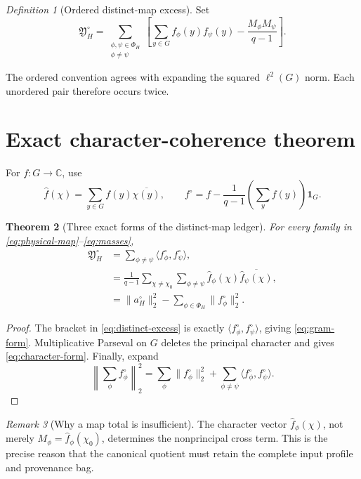 \documentclass[11pt]{article}
\newtheorem{theorem}{Theorem}[section]
\theoremstyle{remark}
\newtheorem{remark}[theorem]{Remark}
\newtheorem{definition}[theorem]{Definition}
\newcommand{\C}{\mathbb C}
\newcommand{\one}{\mathbf 1}
\newcommand{\YH}{\mathfrak Y_H^\circ}
\begin{document}
\begin{definition}[Ordered distinct-map excess]
\label{def:distinct-excess}
Set
\begin{equation}
 \YH
 =
 \sum_{\substack{\phi,\psi\in\Phi_H\\\phi\ne\psi}}
 \left[
  \sum_{y\in G}f_\phi(y)f_\psi(y)
  -\frac{M_\phi M_\psi}{q-1}
 \right].
\label{eq:distinct-excess}
\end{equation}
\end{definition}

The ordered convention agrees with expanding the squared
\(\ell^2(G)\) norm.  Each unordered pair therefore occurs twice.

\section{Exact character-coherence theorem}

For \(f:G\to\C\), use
\[
 \widehat f(\chi)
 =
 \sum_{y\in G}f(y)\overline{\chi(y)},
\qquad
 f^\circ=f-\frac1{q-1}\left(\sum_yf(y)\right)\one_G.
\]

\begin{theorem}[Three exact forms of the distinct-map ledger]
\label{thm:three-forms}
For every family in \cref{eq:physical-map}--\cref{eq:masses},
\begin{align}
 \YH
 &=
 \sum_{\phi\ne\psi}
 \langle f_\phi^\circ,f_\psi^\circ\rangle,
\label{eq:gram-form}\\
 &=
 \frac1{q-1}\sum_{\chi\ne\chi_0}
 \sum_{\phi\ne\psi}
 \widehat f_\phi(\chi)
 \overline{\widehat f_\psi(\chi)},
\label{eq:character-form}\\
 &=
 \|a_H^\circ\|_2^2
 -\sum_{\phi\in\Phi_H}\|f_\phi^\circ\|_2^2.
\label{eq:energy-difference}
\end{align}
\end{theorem}

\begin{proof}
The bracket in \eqref{eq:distinct-excess} is exactly
\(\langle f_\phi^\circ,f_\psi^\circ\rangle\), giving
\eqref{eq:gram-form}.  Multiplicative Parseval on \(G\) deletes the
principal character and gives \eqref{eq:character-form}.  Finally,
expand
\[
 \left\|\sum_\phi f_\phi^\circ\right\|_2^2
 =
 \sum_\phi\|f_\phi^\circ\|_2^2
 +\sum_{\phi\ne\psi}
 \langle f_\phi^\circ,f_\psi^\circ\rangle.
\]
\end{proof}

\begin{remark}[Why a map total is insufficient]
The character vector \(\widehat f_\phi(\chi)\), not merely
\(M_\phi=\widehat f_\phi(\chi_0)\), determines the nonprincipal
cross term.  This is the precise reason that the canonical quotient
must retain the complete input profile and provenance bag.
\end{remark}
\end{document}
